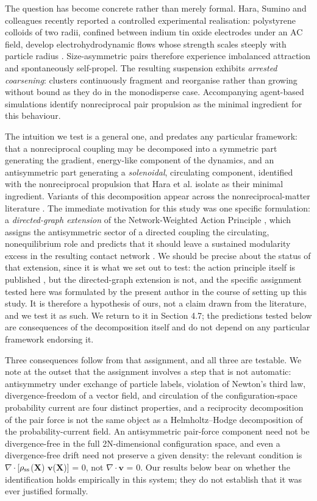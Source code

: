 \documentclass[aps,pre,preprint,superscriptaddress,nofootinbib,longbibliography]{revtex4-2}
\begin{document}
The question has become concrete rather than merely formal. Hara, Sumino and colleagues recently reported a controlled experimental realisation: polystyrene colloids of two radii, confined between indium tin oxide electrodes under an AC field, develop electrohydrodynamic flows whose strength scales steeply with particle radius \cite{r1}. Size-asymmetric pairs therefore experience imbalanced attraction and spontaneously self-propel. The resulting suspension exhibits \emph{arrested coarsening}: clusters continuously fragment and reorganise rather than growing without bound as they do in the monodisperse case. Accompanying agent-based simulations identify nonreciprocal pair propulsion as the minimal ingredient for this behaviour.

The intuition we test is a general one, and predates any particular framework: that a nonreciprocal coupling may be decomposed into a symmetric part generating the gradient, energy-like component of the dynamics, and an antisymmetric part generating a \emph{solenoidal}, circulating component, identified with the nonreciprocal propulsion that Hara et al. isolate as their minimal ingredient. Variants of this decomposition appear across the nonreciprocal-matter literature \cite{r15,r16,r17,r18}. The immediate motivation for this study was one specific formulation: a \emph{directed-graph extension} of the Network-Weighted Action Principle \cite{r9}, which assigns the antisymmetric sector of a directed coupling the circulating, nonequilibrium role and predicts that it should leave a sustained modularity excess in the resulting contact network \cite{r30}. We should be precise about the status of that extension, since it is what we set out to test: the action principle itself is published \cite{r9,r30,r33}, but the directed-graph extension is not, and the specific assignment tested here was formulated by the present author in the course of setting up this study. It is therefore a hypothesis of ours, not a claim drawn from the literature, and we test it as such. We return to it in Section 4.7; the predictions tested below are consequences of the decomposition itself and do not depend on any particular framework endorsing it.

Three consequences follow from that assignment, and all three are testable. We note at the outset that the assignment involves a step that is not automatic: antisymmetry under exchange of particle labels, violation of Newton's third law, divergence-freedom of a vector field, and circulation of the configuration-space probability current are four distinct properties, and a reciprocity decomposition of the pair force is not the same object as a Helmholtz--Hodge decomposition of the probability-current field. An antisymmetric pair-force component need not be divergence-free in the full 2N-dimensional configuration space, and even a divergence-free drift need not preserve a given density: the relevant condition is $\nabla \cdot$[$\rho_{\rm ss}$($\mathbf{X}$) $\mathbf{v}$($\mathbf{X}$)] = 0, not $\nabla \cdot$$\mathbf{v}$ = 0. Our results below bear on whether the identification holds empirically in this system; they do not establish that it was ever justified formally.
\end{document}
